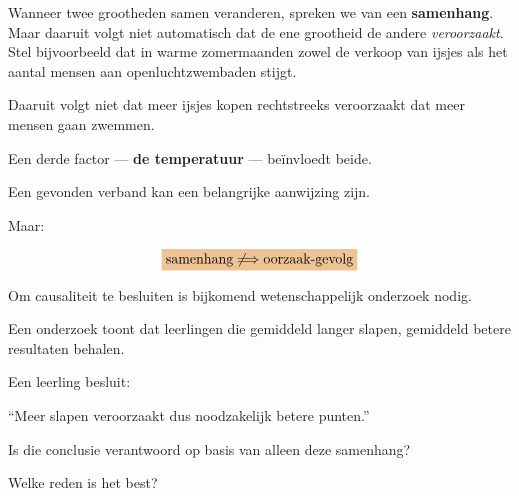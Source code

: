 \documentclass{ximera}
\begin{document}


Wanneer twee grootheden samen veranderen, spreken we van een
\textbf{samenhang}. Maar daaruit volgt niet automatisch dat de ene grootheid de andere
\emph{veroorzaakt}. Stel bijvoorbeeld dat in warme zomermaanden zowel de verkoop van ijsjes
als het aantal mensen aan openluchtzwembaden stijgt.

Daaruit volgt niet dat meer ijsjes kopen rechtstreeks veroorzaakt dat
meer mensen gaan zwemmen.

Een derde factor --- \textbf{de temperatuur} --- beïnvloedt beide.

\begin{opmerking}
Een gevonden verband kan een belangrijke aanwijzing zijn.

Maar:

\[
\important{
\text{samenhang}
\not\Longrightarrow
\text{oorzaak-gevolg}
}
\]

Om causaliteit te besluiten is bijkomend wetenschappelijk onderzoek
nodig.
\end{opmerking}


\begin{oefening}{\oefU}

Een onderzoek toont dat leerlingen die gemiddeld langer slapen,
gemiddeld betere resultaten behalen.

Een leerling besluit:

\begin{center}
``Meer slapen veroorzaakt dus noodzakelijk betere punten.''
\end{center}

\begin{question}
Is die conclusie verantwoord op basis van alleen deze samenhang?

\begin{multipleChoice}
\end{multipleChoice}
\end{question}

\begin{question}
Welke reden is het best?

\begin{multipleChoice}
\end{multipleChoice}
\end{question}

\end{oefening}
\end{document}
